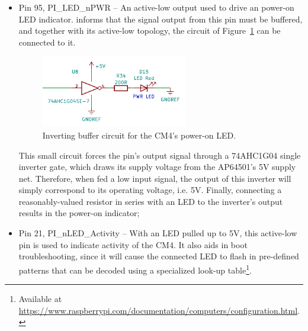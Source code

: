 \begin{itemize}
	\item Pin 95, PI\_LED\_nPWR -- An active-low output used to drive an power-on LED indicator.
	\cite{CM4} informs that the signal output from this pin must be buffered, and together with its active-low topology, the circuit of Figure~\ref{fig:PI_LED_nPWR} can be connected to it.
	\begin{figure}[H]
		\centering
		\includegraphics[width=0.6\textwidth]{Chapters/Figures/chapter3/PI_LED_nPWR.pdf}
		\caption{Inverting buffer circuit for the CM4's power-on LED.}
		\label{fig:PI_LED_nPWR}
	\end{figure}
	This small circuit forces the pin's output signal through a 74AHC1G04 single inverter gate, which draws its supply voltage from the AP64501's 5V supply net. Therefore, when fed a low input signal, the output of this inverter will simply correspond to its operating voltage, i.e. 5V. Finally, connecting a reasonably-valued resistor in series with an LED to the inverter's output results in the power-on indicator;

	\item Pin 21, PI\_nLED\_Activity -- With an LED pulled up to 5V, this active-low pin is used to indicate activity of the CM4. It also aids in boot troubleshooting, since it will cause the connected LED to flash in pre-defined patterns that can be decoded using a specialized look-up table\footnote[16]{Available at \url{https://www.raspberrypi.com/documentation/computers/configuration.html}.}.
\end{itemize}

